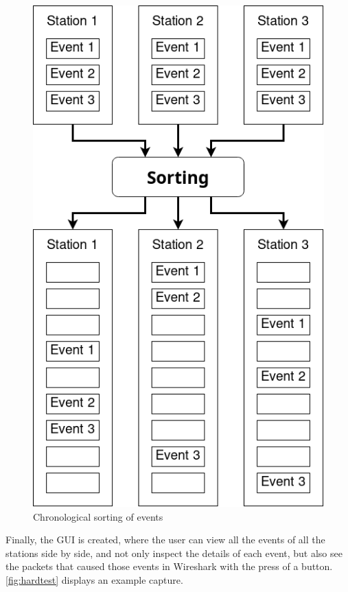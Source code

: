\begin{figure}[htb]
   \centering
   \includegraphics[scale=.4]{eventsort}
   \caption{Chronological sorting of events}\label{fig:sort}
\end{figure}

Finally, the \ac{GUI} is created, where the user can view all the events of all
the stations side by side, and not only inspect the details of each event, but
also see the packets that caused those events in Wireshark with the press of a
button. \autoref{fig:hardtest} displays an example capture.

